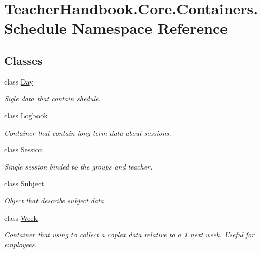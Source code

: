 \hypertarget{namespace_teacher_handbook_1_1_core_1_1_containers_1_1_schedule}{}\section{Teacher\+Handbook.\+Core.\+Containers.\+Schedule Namespace Reference}
\label{namespace_teacher_handbook_1_1_core_1_1_containers_1_1_schedule}
\subsection*{Classes}
\begin{DoxyCompactItemize}
\item 
class \mbox{\hyperlink{class_teacher_handbook_1_1_core_1_1_containers_1_1_schedule_1_1_day}{Day}}
\begin{DoxyCompactList}\small\item\em Sigle data that contain shedule. \end{DoxyCompactList}\item 
class \mbox{\hyperlink{class_teacher_handbook_1_1_core_1_1_containers_1_1_schedule_1_1_logbook}{Logbook}}
\begin{DoxyCompactList}\small\item\em Container that contain long term data about sessions. \end{DoxyCompactList}\item 
class \mbox{\hyperlink{class_teacher_handbook_1_1_core_1_1_containers_1_1_schedule_1_1_session}{Session}}
\begin{DoxyCompactList}\small\item\em Single session binded to the groups and teacher. \end{DoxyCompactList}\item 
class \mbox{\hyperlink{class_teacher_handbook_1_1_core_1_1_containers_1_1_schedule_1_1_subject}{Subject}}
\begin{DoxyCompactList}\small\item\em Object that describe subject data. \end{DoxyCompactList}\item 
class \mbox{\hyperlink{class_teacher_handbook_1_1_core_1_1_containers_1_1_schedule_1_1_week}{Week}}
\begin{DoxyCompactList}\small\item\em Container that using to collect a coplex data relative to a 1 next week. Useful for employees. \end{DoxyCompactList}\end{DoxyCompactItemize}
